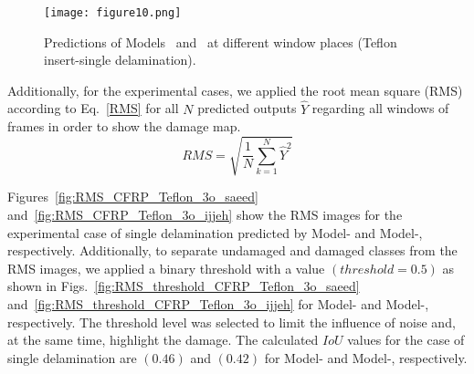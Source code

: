 \begin{figure}[!h]
	\centering
	\texttt{[image: figure10.png]}
	\caption{Predictions of Models~ and~ at different window places (Teflon insert-single delamination).}
	\label{fig:CFRP_Teflon_3o_predictions}
\end{figure}

Additionally, for the experimental cases, we applied the root mean square (RMS) according to Eq.~\ref{RMS} for all \(N\) predicted outputs \(\hat{Y}\) regarding all windows of frames in order to show the damage map.
\begin{equation}
	RMS = \sqrt{\frac{1}{N}\sum_{k=1}^{N}\hat{Y}^2}	
	\label{RMS}
\end{equation}

Figures~\ref{fig:RMS_CFRP_Teflon_3o_saeed} and~\ref{fig:RMS_CFRP_Teflon_3o_ijjeh} show the RMS images for the experimental case of single delamination predicted by Model- and Model-, respectively.
Additionally, to separate undamaged and damaged classes from the RMS images, we applied a binary threshold with a value \((threshold=0.5)\) as shown in Figs.~\ref{fig:RMS_threshold_CFRP_Teflon_3o_saeed} and~\ref{fig:RMS_threshold_CFRP_Teflon_3o_ijjeh} for Model- and Model-, respectively. 
The threshold level was selected to limit the influence of noise and, at the same time, highlight the damage.
The calculated \(IoU\) values for the case of single delamination are \((0.46)\) and \((0.42)\) for Model- and Model-, respectively.

